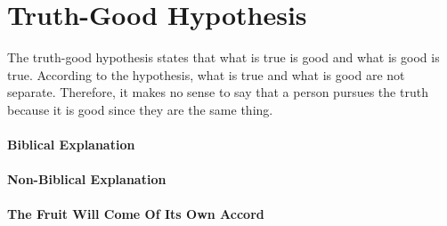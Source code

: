 \documentclass[a4paper, 12pt]{article}
\begin{document}
\section*{Truth-Good Hypothesis}
The truth-good hypothesis states that what is true is good and what is good is true. According to the hypothesis, what is true and what is good are not separate. Therefore, it makes no sense to say that a person pursues the truth because it is good since they are the same thing.
\paragraph{Biblical Explanation}
\paragraph{Non-Biblical Explanation}
\paragraph{The Fruit Will Come Of Its Own Accord}
\end{document}
